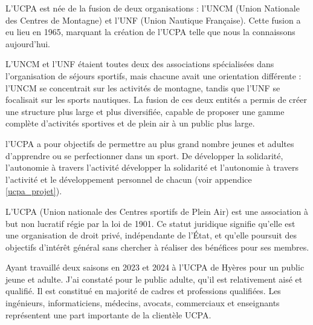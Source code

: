 \documentclass[12pt,a4paper]{report}
\begin{document}

L'UCPA est  née de la fusion de deux organisations : l'UNCM 
(Union Nationale des Centres de Montagne)
et l'UNF (Union Nautique Française). Cette fusion a eu lieu en
1965, marquant la création de l'UCPA telle que nous la connaissons aujourd'hui.

L'UNCM et l'UNF étaient toutes deux des associations spécialisées
dans l'organisation de  séjours sportifs, mais chacune avait une
orientation différente : l'UNCM se concentrait sur les activités 
de montagne, tandis que l'UNF se focalisait sur les sports nautiques. 
La fusion de ces deux entités a permis de créer une structure plus 
large et plus diversifiée, capable de proposer une gamme complète 
d'activités sportives et de plein air à un public plus large.


l'UCPA a pour objectifs de permettre au plus grand nombre jeunes et adultes
d'apprendre ou se perfectionner dans un sport. De développer la solidarité,
l'autonomie à travers l'activité développer la solidarité et l'autonomie
à travers l'activité et le développement personnel de chacun 
(voir appendice \ref{ucpa_projet}).



L'UCPA (Union nationale des Centres sportifs de Plein Air) est une association
à but non lucratif régie par la loi de 1901. Ce statut juridique signifie qu'elle est une
organisation de droit privé, indépendante de l'État, et qu'elle poursuit des 
objectifs d'intérêt général sans chercher à réaliser des bénéfices pour ses membres.


Ayant travaillé  deux saisons en 2023 et 2024 à l'UCPA de Hyères pour 
un public jeune et adulte. J'ai  constaté pour le public 
adulte, qu'il est relativement aisé et qualifié. Il est
constitué en majorité de cadres et professions qualifiées. Les
ingénieurs, informaticiens, médecins, avocats, commerciaux et enseignants
représentent une part importante de la clientèle UCPA.
\end{document}
